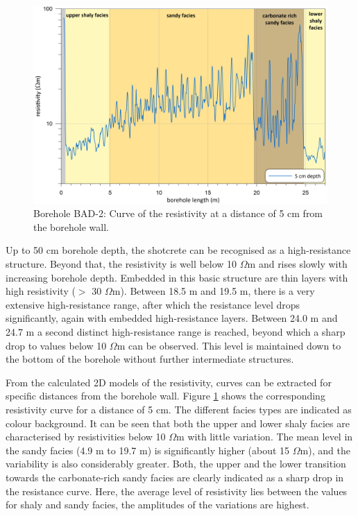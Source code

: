 \begin{figure}[!ht]
	\centering
		\includegraphics[width=1\textwidth]{./figures/fig-ERT-3.jpg}
	\caption{Borehole BAD-2: Curve of the resistivity at a distance of 5 cm from the borehole wall.}
	\label{fig:ERT-model-curve}
\end{figure}
Up to 50 cm borehole depth, the shotcrete can be recognised as a high-resistance structure. Beyond that, the resistivity is well below 10 $\Omega$m and rises slowly with increasing borehole depth. Embedded in this basic structure are thin layers with high resistivity ($>$ 30 $\Omega$m). Between 18.5 m and 19.5 m, there is a very extensive high-resistance range, after which the resistance level drops significantly, again with embedded high-resistance layers. Between 24.0 m and 24.7 m a second distinct high-resistance range is reached, beyond which a sharp drop to values below 10 $\Omega$m can be observed. This level is maintained down to the bottom of the borehole without further intermediate structures.

From the calculated 2D models of the resistivity, curves can be extracted for specific distances from the borehole wall. Figure \ref{fig:ERT-model-curve} shows the corresponding resistivity curve for a distance of 5 cm. The different facies types are indicated as colour background. It can be seen that both the upper and lower shaly facies are characterised by resistivities below 10 $\Omega$m with little variation. The mean level in the sandy facies (4.9 m to 19.7 m) is significantly higher (about 15 $\Omega$m), and the variability is also considerably greater. Both, the upper and the lower transition towards the carbonate-rich sandy facies are clearly indicated as a sharp drop in the resistance curve. Here, the average level of resistivity lies between the values for shaly and sandy facies, the amplitudes of the variations are highest.

